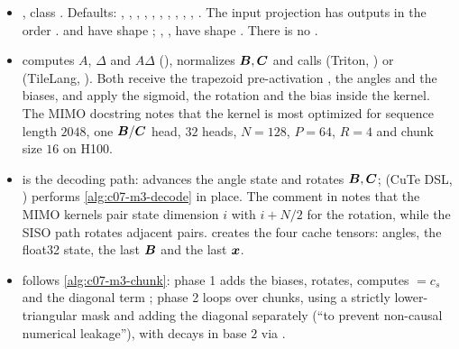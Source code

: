 \begin{implnote}[title={In the code: \texttt{state-spaces/mamba}, module and kernels}]
\begin{itemize}
\item {}, class .
  Defaults: , , , ,
  , , , ,
  , , . The input projection has
   outputs in the
  order .  and  have shape
  ; , ,  have shape
  . There is no .
\item {} computes $A$, $\Delta$ and $A\Delta$ (), normalizes $\bm{B},\bm{C}$ and
  calls  (Triton,
  ) or  (TileLang,
  ). Both receive the trapezoid
  pre-activation , the angles and the biases, and apply the sigmoid, the
  rotation and the bias inside the kernel. The MIMO docstring notes that the kernel is most
  optimized for sequence length $2048$, one $\bm{B}/\bm{C}$ head, $32$ heads, $N=128$, $P=64$,
  $R=4$ and chunk size $16$ on H100.
\item {} is the decoding path:  advances the angle
  state and rotates $\bm{B},\bm{C}$;  (CuTe DSL,
  ) performs \cref{alg:c07-m3-decode} in
  place. The comment in  notes that the MIMO kernels pair state dimension $i$ with
  $i+N/2$ for the rotation, while the SISO path rotates adjacent pairs. 
  creates the four cache tensors: angles, the float32 state, the last $\bm{B}$ and the last $\bm{x}$.
\item {} follows \cref{alg:c07-m3-chunk}:
  phase 1 adds the biases, rotates, computes  $= c_s$ and the diagonal term
  ; phase 2 loops over chunks, using a strictly lower-triangular mask and adding
  the diagonal separately (``to prevent non-causal numerical leakage''), with decays in base
  $2$ via .
\end{itemize}
\end{implnote}

